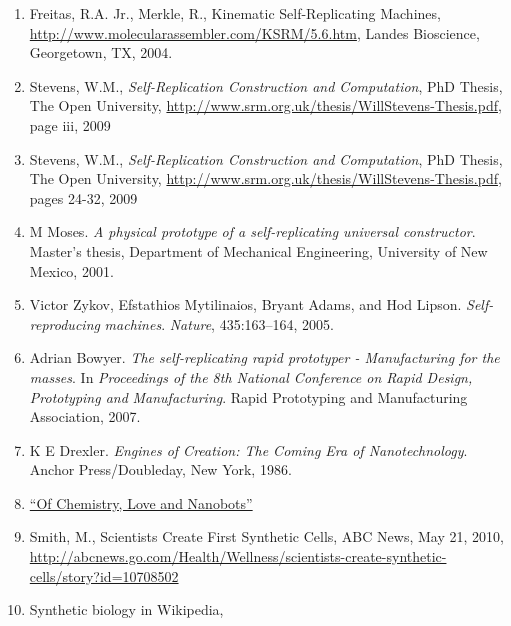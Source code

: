 \begin{enumerate}
\item \label{bkm:Ref330755466}Freitas, R.A. Jr., Merkle, R., Kinematic
Self-Replicating Machines,
\url{http://www.molecularassembler.com/KSRM/5.6.htm}, Landes
Bioscience, Georgetown, TX, 2004.
\item \label{bkm:Ref330757844}Stevens, W.M., \textit{Self-Replication
Construction and Computation}, PhD Thesis, The Open University,
\url{http://www.srm.org.uk/thesis/WillStevens-Thesis.pdf}, page iii,
2009
\item \label{bkm:Ref330750347}Stevens, W.M., \textit{Self-Replication
Construction and Computation}, PhD Thesis, The Open University,
\url{http://www.srm.org.uk/thesis/WillStevens-Thesis.pdf}, pages 24-32,
2009
\item \label{bkm:Ref330751664}M Moses. \textit{A physical prototype of a
self-replicating universal constructor}.  Master’s thesis, Department
of Mechanical Engineering, University of New Mexico, 2001.
\item \label{bkm:Ref330752277}Victor Zykov, Efstathios Mytilinaios,
Bryant Adams, and Hod Lipson. \textit{Self-reproducing}\textit{
machines}. \textit{Nature}, 435:163–164, 2005.
\item \label{bkm:Ref330753103}Adrian Bowyer.  \textit{The
self-replicating rapid prototyper - Manufacturing for the masses}. In
\textit{Proceedings of the 8th National Conference on Rapid Design,
Prototyping and} \textit{Manufacturing}. Rapid Prototyping and
Manufacturing Association, 2007.
\item \label{bkm:Ref330756364}K E Drexler. \textit{Engines of Creation:
The Coming Era of Nanotechnology}. Anchor Press/Doubleday, New York,
1986.
\item \label{bkm:Ref331270777}\href{http://www.sciamdigital.com/index.cfm?fa=Products.ViewIssuePreview&ARTICLEID_CHAR=F90C4210-C153-4B2F-83A1-28F2012B637}{``Of
Chemistry, Love and Nanobots''}\textstylecitation{
}
\item \label{bkm:Ref330845705}Smith, M.,
\textcolor[rgb]{0.2,0.2,0.2}{Scientists Create First
{\textquotesingle}Synthetic{\textquotesingle} Cells, ABC News, May 21,
2010,
}\url{http://abcnews.go.com/Health/Wellness/scientists-create-synthetic-cells/story?id=10708502}
\item \label{bkm:Ref330927503}Synthetic biology in Wikipedia,

\end{enumerate}
